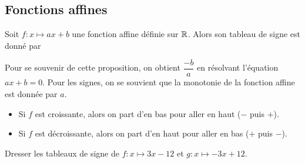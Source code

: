 \documentclass{poly}
\begin{document}
\begin{example}
\hfill

\vspace*{0.2cm}
\begin{minipage}{0.45\textwidth}
\end{minipage}
\hfill\vline\hfill
\begin{minipage}{0.45\textwidth}
\end{minipage}
\end{example}

\subsection{Fonctions affines}

\begin{proposition}
Soit $f : x \mapsto ax + b$ une fonction affine définie sur $\mathbb{R}$. Alors son tableau de signe est donné par
\begin{center}
\end{center}
\end{proposition}
\begin{remark}
Pour se souvenir de cette proposition, on obtient $\dfrac{-b}{a}$ en résolvant l'équation $ax + b = 0$. Pour les signes, on se souvient que la monotonie de la fonction affine est donnée par $a$.
\begin{itemize}
\item Si $f$ est croissante, alors on part d'en bas pour aller en haut ($-$ puis $+$).
\item Si $f$ est décroissante, alors on part d'en haut pour aller en bas ($+$ puis $-$).
\end{itemize}
\end{remark}
\begin{example}
Dresser les tableaux de signe de $f : x \mapsto 3x - 12$ et $g : x \mapsto -3x + 12$.
\end{example}
\end{document}
